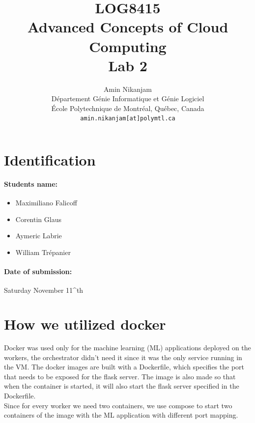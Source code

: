 \documentclass[11pt]{article}
\title{LOG8415\\Advanced Concepts of Cloud Computing\\Lab 2}
\author{
    Amin Nikanjam \\
    D\'{e}partement G\'{e}nie Informatique et G\'{e}nie Logiciel \\
    \'{E}cole Polytechnique de Montr\'{e}al, Qu\'{e}bec, Canada \\
    \texttt{amin.nikanjam[at]polymtl.ca} \\
}
\date{}
\def\auteur{}
\begin{document}
\maketitle

\section{Identification}

\paragraph{Students name:} 
\begin{itemize}
	\item Maximiliano Falicoff
	\item Corentin Glaus
	\item Aymeric Labrie
	\item William Trépanier

\end{itemize}
\auteur

\paragraph{Date of submission:} Saturday November 11^{th} 

\section{How we utilized docker}
Docker was used only for the machine learning (ML) applications deployed on the workers, the orchestrator didn't need it since it was the only service running in the VM. The docker images are built with a Dockerfile, which specifies the port that needs to be exposed for the flask server. The image is also made so that when the container is started, it will also start the flask server specified in the Dockerfile. 
\newline
\\
Since for every worker we need two containers, we use compose to start two containers of the image with the ML application with different port mapping.
\end{document}
